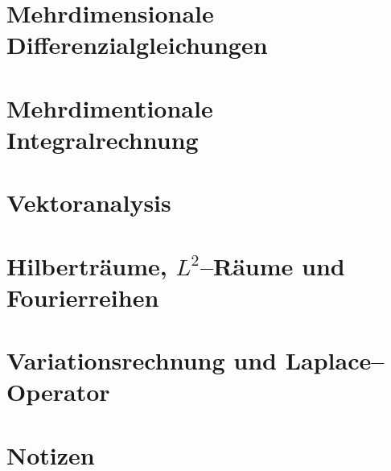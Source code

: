 \documentclass[a4paper,12pt]{article}
\begin{document}
\section{Mehrdimensionale Differenzialgleichungen}

\section{Mehrdimentionale Integralrechnung}

\section{Vektoranalysis}

\section{Hilberträume, $L^2$--Räume und Fourierreihen}

\section{Variationsrechnung und Laplace--Operator}



\section{Notizen}

\end{document}
